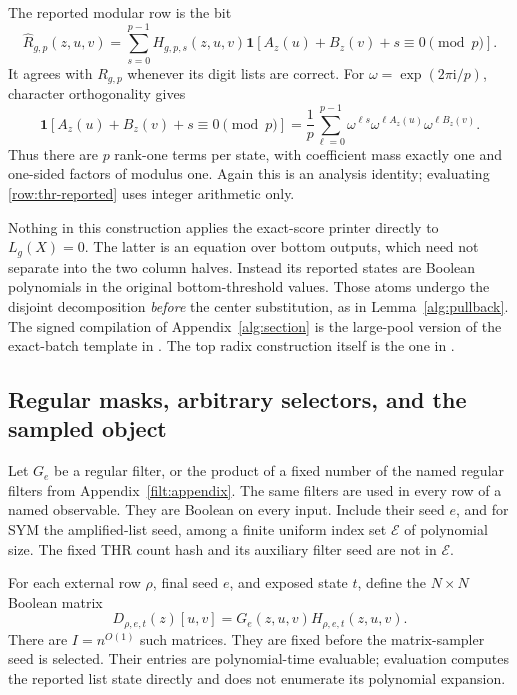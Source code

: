 \documentclass[11pt,letterpaper]{article}
\theoremstyle{definition}
\theoremstyle{remark}
\newcommand{\ind}{\mathbf 1}
\begin{document}
The reported modular row is the bit
\begin{equation}
 \widehat R_{g,p}(z,u,v)=
 \sum_{s=0}^{p-1}H_{g,p,s}(z,u,v)
       \ind[A_z(u)+B_z(v)+s\equiv0\pmod p].
 \label{row:thr-reported}
\end{equation}
It agrees with $R_{g,p}$ whenever its digit lists are correct.
For $\omega=\exp(2\pi\mathrm{i}/p)$, character orthogonality gives
\begin{equation}
 \ind[A_z(u)+B_z(v)+s\equiv0\pmod p]
 =\frac1p\sum_{\ell=0}^{p-1}
       \omega^{\ell s}\omega^{\ell A_z(u)}\omega^{\ell B_z(v)}.
 \label{row:modular-fourier}
\end{equation}
Thus there are $p$ rank-one terms per state, with coefficient mass
exactly one and one-sided factors of modulus one.  Again this is an
analysis identity; evaluating \eqref{row:thr-reported} uses integer
arithmetic only.

Nothing in this construction applies the exact-score printer directly
to $L_g(X)=0$.  The latter is an equation over bottom outputs, which
need not separate into the two column halves.  Instead its reported
states are Boolean polynomials in the original bottom-threshold values.
Those atoms undergo the disjoint decomposition \emph{before} the
center substitution, as in Lemma~\ref{alg:pullback}.  The signed
compilation of Appendix~\ref{alg:section} is the large-pool version of
the exact-batch template in \cite[Theorem~A.5]{NagCubic}.  The top
radix construction itself is the one in \cite[Appendix~A.13]{NagCubic}.

\subsection{Regular masks, arbitrary selectors, and the sampled object}

Let $G_e$ be a regular filter, or the product of a fixed number of the
named regular filters from Appendix~\ref{filt:appendix}.  The same
filters are used in every row of a named observable.  They are Boolean
on every input.  Include their seed $e$, and for SYM the amplified-list
seed, among a finite uniform index set $\mathcal E$ of polynomial size.
The fixed THR count hash and its auxiliary filter seed are not in
$\mathcal E$.

For each external row $\rho$, final seed $e$, and exposed state $t$,
define the $N\times N$ Boolean matrix
\begin{equation}
 D_{\rho,e,t}(z)[u,v]=G_e(z,u,v)H_{\rho,e,t}(z,u,v).
 \label{row:matrix}
\end{equation}
There are $I=n^{O(1)}$ such matrices.  They are fixed before the
matrix-sampler seed is selected.  Their entries are polynomial-time
evaluable; evaluation computes the reported list state directly and
does not enumerate its polynomial expansion.
\end{document}
